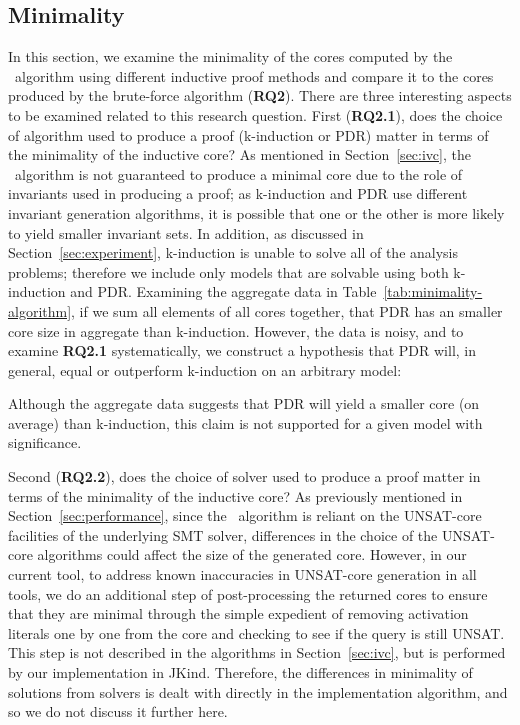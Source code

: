 \subsection{Minimality}
\label{sec:minimality}
In this section, we examine the minimality of the cores computed by the \ucalg\ algorithm using different inductive proof methods and compare it to the cores produced by the brute-force algorithm (\textbf{RQ2}).  There are three interesting aspects to be examined related to this research question.  First (\textbf{RQ2.1}), does the choice of algorithm used to produce a proof (k-induction or PDR) matter in terms of the minimality of the inductive core?   As mentioned in Section~\ref{sec:ivc}, the \ucalg\ algorithm is not guaranteed to produce a minimal core due to the role of invariants used in producing a proof; as k-induction and PDR use different invariant generation algorithms, it is possible that one or the other is more likely to yield smaller invariant sets.  In addition, as discussed in Section~\ref{sec:experiment}, k-induction is unable to solve all of the analysis problems; therefore we include only models that are solvable using both k-induction and PDR.  Examining the aggregate data in Table~\ref{tab:minimality-algorithm}, if we sum all elements of all cores together, that PDR has an smaller core size in aggregate than k-induction.  However, the data is noisy, and to examine \textbf{RQ2.1} systematically, we construct a hypothesis that PDR will, in general, equal or outperform k-induction on an arbitrary model:


Although the aggregate data suggests that PDR will yield a smaller core (on average) than k-induction, this claim is not supported for a given model with significance.


Second (\textbf{RQ2.2}), does the choice of solver used to produce a proof matter in terms of the minimality of the inductive core?   As previously mentioned in Section~\ref{sec:performance}, since the \ucalg\ algorithm is reliant on the UNSAT-core facilities of the underlying SMT solver, differences in the choice of the UNSAT-core algorithms could affect the size of the generated core.  However, in our current tool, to address known inaccuracies in UNSAT-core generation in all tools, we do an additional step of post-processing the returned cores to ensure that they are minimal through the simple expedient of removing activation literals one by one from the core and checking to see if the query is still UNSAT.  This step is not described in the algorithms in Section~\ref{sec:ivc}, but is performed by our implementation in JKind.  Therefore, the differences in minimality of solutions from solvers is dealt with directly in the implementation algorithm, and so we do not discuss it further here.

